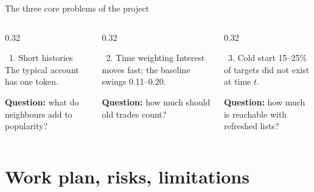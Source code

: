 \documentclass[aspectratio=169,10pt]{beamer}
\begin{document}
\begin{frame}{The three core problems of the project}
  \begin{columns}[T]
    \begin{column}{0.32\textwidth}
      \begin{block}{\faUser\ 1. Short histories}
        \small
        The typical account has one token.
        \par\smallskip
        \textbf{Question:} what do neighbours add to popularity?
      \end{block}
    \end{column}
    \begin{column}{0.32\textwidth}
      \begin{block}{\faClock[regular]\ 2. Time weighting}
        \small
        Interest moves fast; the baseline swings 0.11--0.20.
        \par\smallskip
        \textbf{Question:} how much should old trades count?
      \end{block}
    \end{column}
    \begin{column}{0.32\textwidth}
      \begin{block}{\faSeedling\ 3. Cold start}
        \small
        15--25\% of targets did not exist at time $t$.
        \par\smallskip
        \textbf{Question:} how much is reachable with refreshed lists?
      \end{block}
    \end{column}
  \end{columns}
\end{frame}

\section{Work plan, risks, limitations}
\end{document}
